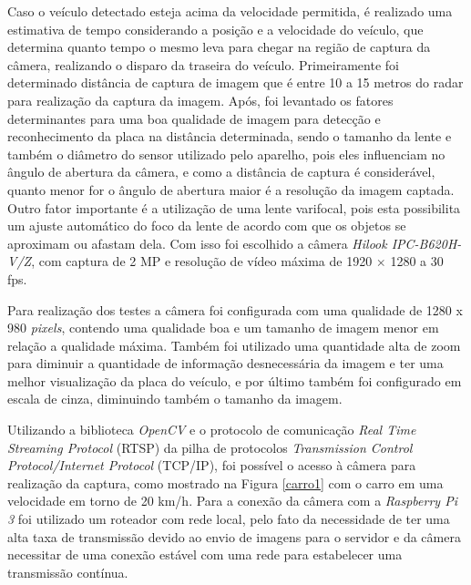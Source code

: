 Caso o veículo detectado esteja acima da velocidade permitida, é realizado uma estimativa de tempo considerando a posição e a velocidade do veículo, que determina quanto tempo o mesmo leva para chegar na região de captura da câmera, realizando o disparo da traseira do veículo.
Primeiramente foi determinado distância de captura de imagem que é entre 10 a 15 metros do radar para realização da captura da imagem. Após, foi levantado os fatores determinantes para uma boa qualidade de imagem para detecção e reconhecimento da placa na distância determinada, sendo o tamanho da lente e também o diâmetro do sensor utilizado pelo aparelho, pois eles influenciam no ângulo de abertura da câmera, e como a distância de captura é considerável, quanto menor for o ângulo de abertura maior é a resolução da imagem captada. Outro fator importante é a utilização de uma lente varifocal, pois esta possibilita um ajuste automático do foco da lente de acordo com que os objetos se aproximam ou afastam dela. Com isso foi escolhido a câmera \emph{Hilook IPC-B620H-V/Z}, com captura de 2 MP e resolução de vídeo máxima de 1920 $\times$ 1280 a 30 fps. \par 
Para realização dos testes a câmera foi configurada com uma qualidade de 1280 x 980 \emph{pixels}, contendo uma qualidade boa e um tamanho de imagem menor em relação a qualidade máxima. Também foi utilizado uma quantidade alta de zoom para diminuir a quantidade de informação desnecessária da imagem e ter uma melhor visualização da placa do veículo, e por último também foi configurado em escala de cinza, diminuindo também o tamanho da imagem. 
\par
Utilizando a biblioteca \emph{OpenCV} e o protocolo de comunicação  \emph{Real Time Streaming Protocol} (RTSP) da pilha de protocolos \emph{Transmission Control Protocol/Internet Protocol} (TCP/IP), foi possível o acesso à câmera para realização da captura, como mostrado na Figura \ref{carro1} com o carro em uma velocidade em torno de 20 km/h. Para a conexão da câmera com a \emph{Raspberry Pi 3} foi utilizado um roteador com rede local, pelo fato da necessidade de ter uma alta taxa de transmissão devido ao envio de imagens para o servidor e da câmera necessitar de uma conexão estável com uma rede para estabelecer uma transmissão contínua. 


